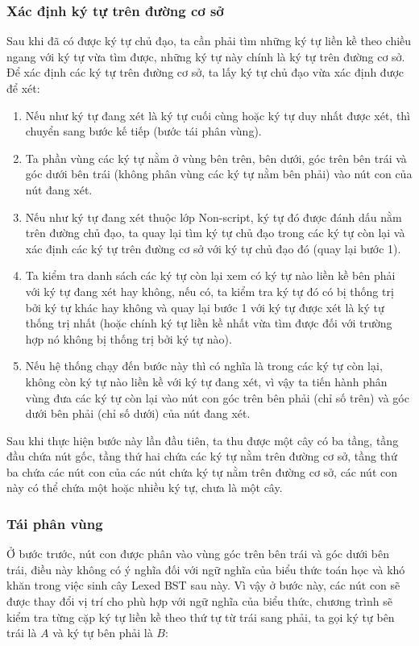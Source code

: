 \documentclass[a4paper,12pt]{article}
\begin{document}
	\subsubsection*{Xác định ký tự trên đường cơ sở}
	
	Sau khi đã có được ký tự chủ đạo, ta cần phải tìm những ký tự liền kề theo chiều ngang với ký tự vừa tìm được, những ký tự này chính là ký tự trên đường cơ sở. Để xác định các ký tự trên đường cơ sở, ta lấy ký tự chủ đạo vừa xác định được để xét:
	
	\begin{enumerate}
		\item Nếu như ký tự đang xét là ký tự cuối cùng hoặc ký tự duy nhất được xét, thì chuyển sang bước kế tiếp (bước tái phân vùng).
		\item Ta phần vùng các ký tự nằm ở vùng bên trên, bên dưới, góc trên bên trái và góc dưới bên trái (không phân vùng các ký tự nằm bên phải) vào nút con của nút đang xét.
		\item Nếu như ký tự đang xét thuộc lớp Non-script, ký tự đó được đánh dấu nằm trên đường chủ đạo, ta quay lại tìm ký tự chủ đạo trong các ký tự còn lại và xác định các ký tự trên đường cơ sở với ký tự chủ đạo đó (quay lại bước 1).
		\item Ta kiểm tra danh sách các ký tự còn lại xem có ký tự nào liền kề bên phải với ký tự đang xét hay không, nếu có, ta kiểm tra ký tự đó có bị thống trị bởi ký tự khác hay không và quay lại bước 1 với ký tự được xét là ký tự thống trị nhất (hoặc chính ký tự liền kề nhất vừa tìm được đối với trường hợp nó không bị thống trị bởi ký tự nào).
		\item Nếu hệ thống chạy đến bước này thì có nghĩa là trong các ký tự còn lại, không còn ký tự nào liền kề với ký tự đang xét, vì vậy ta tiến hành phân vùng đưa các ký tự còn lại vào nút con góc trên bên phải (chỉ số trên) và góc dưới bên phải (chỉ số dưới) của nút đang xét.
	\end{enumerate}
	
	Sau khi thực hiện bước này lần đầu tiên, ta thu được một cây có ba tầng, tầng đầu chứa nút gốc, tầng thứ hai chứa các ký tự nằm trên đường cơ sở, tầng thứ ba chứa các nút con của các nút chứa ký tự nằm trên đường cơ sở, các nút con này có thể chứa một hoặc nhiều ký tự, chưa là một cây.
	
	\subsubsection*{Tái phân vùng}
	Ở bước trước, nút con được phân vào vùng góc trên bên trái và góc dưới bên trái, điều này không có ý nghĩa đối với ngữ nghĩa của biểu thức toán học và khó khăn trong việc sinh cây Lexed BST sau này. Vì vậy ở bước này, các nút con sẽ được thay đổi vị trí cho phù hợp với ngữ nghĩa của biểu thức, chương trình sẽ kiểm tra từng cặp ký tự liền kề theo thứ tự từ trái sang phải, ta gọi ký tự bên trái là $A$ và ký tự bên phải là $B$:\\
	
\end{document}

